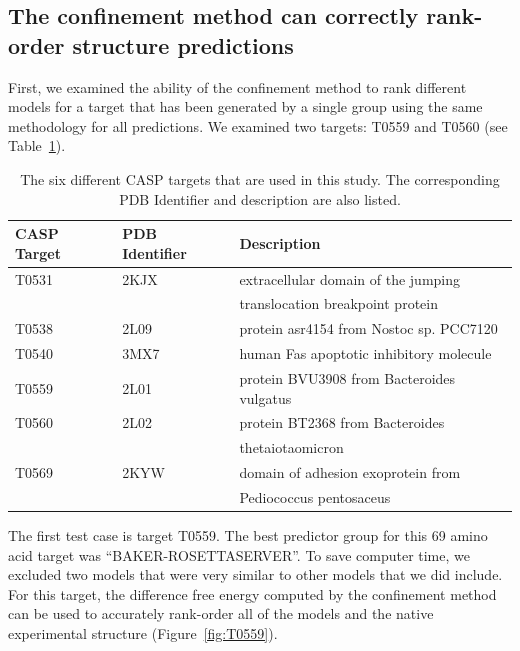 \documentclass[12pt]{article}
\begin{document}
\subsection*{The confinement method can correctly rank-order structure predictions}

First, we examined the ability of the confinement method to rank different models for a target that has been generated
by a single group using the same methodology for all predictions. We examined two targets: T0559 and T0560 (see
Table~\ref{table:casp_testcase}).


\begin{table}
\begin{center}
\caption{The six different CASP targets that are used in this study. The corresponding PDB Identifier and description
    are also listed.}
\label{table:casp_testcase}
\begin{tabular}{l l l}\hline
    CASP Target  & PDB Identifier &  Description \\ \hline
     T0531       &    2KJX        &  extracellular domain of the jumping  \\
                 &                &  translocation breakpoint protein  \\ \hline
     T0538       &    2L09        &  protein asr4154 from Nostoc sp. PCC7120     \\ \hline
     T0540       &    3MX7        &  human Fas apoptotic inhibitory molecule     \\ \hline
     T0559       &    2L01        &  protein BVU3908 from Bacteroides vulgatus   \\ \hline
     T0560       &    2L02        &  protein BT2368 from Bacteroides  \\
                 &                &  thetaiotaomicron         \\ \hline
     T0569       &    2KYW        &  domain of adhesion exoprotein from \\
                 &                &   Pediococcus pentosaceus \\ \hline
\end{tabular}
\end{center}
\end{table}


The first test case is target T0559. The best predictor group for this 69 amino acid target was ``BAKER-ROSETTASERVER''.
To save computer time, we excluded two models that were very similar to other models that we did include. For this
target, the difference free energy computed by the confinement method can be used to accurately rank-order all of the
models and the native experimental structure (Figure~\ref{fig:T0559}).
\end{document}
